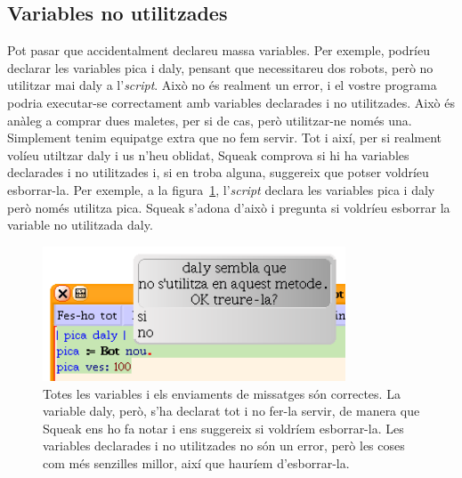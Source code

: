 \subsection{Variables no utilitzades}
Pot pasar que accidentalment declareu massa variables. Per exemple, podríeu declarar les variables \textsf{pica} i \textsf{daly}, pensant que necessitareu dos robots, però no utilitzar mai \textsf{daly} a l'\emph{script}. Això no és realment un error, i el vostre programa podria executar-se correctament amb variables declarades i no utilitzades. Això és anàleg a comprar dues maletes, per si de cas, però utilitzar-ne només una. Simplement tenim equipatge extra que no fem servir. Tot i així, per si realment volíeu utiltzar \textsf{daly} i us n'heu oblidat, Squeak comprova si hi ha variables declarades i no utilitzades i, si en troba alguna, suggereix que potser voldríeu esborrar-la. Per exemple, a la figura~\ref{fig0207}, l'\emph{script} declara les variables \textsf{pica} i \textsf{daly} però només utilitza \textsf{pica}. Squeak s'adona d'això i pregunta si voldríeu esborrar la variable no utilitzada \textsf{daly}. 

\begin{figure}[h]
\begin{center}
\includegraphics[height=40mm ,width=90mm ]{Imatges/figura2-7.png}
\end{center}
\caption{Totes les variables i els enviaments de missatges són correctes. La variable \textsf{\upshape daly}, però, s'ha declarat tot i no fer-la servir, de manera que Squeak ens ho fa notar i ens suggereix si voldríem esborrar-la. Les variables declarades i no utilitzades no són un error, però les coses com més senzilles millor, així que hauríem d'esborrar-la.}
\label{fig0207}
\end{figure}

